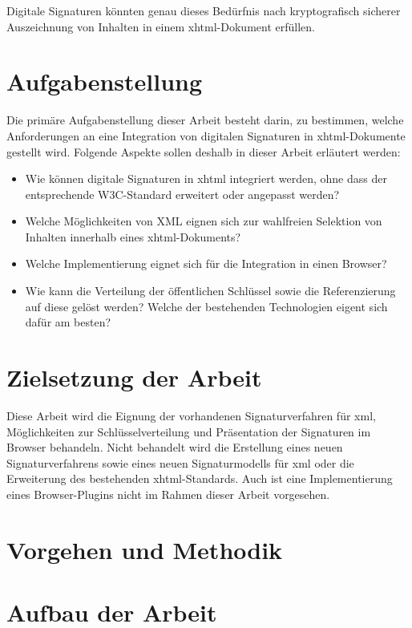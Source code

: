 Digitale Signaturen könnten genau dieses Bedürfnis nach kryptografisch sicherer Auszeichnung von Inhalten in einem \gls{xhtml}-Dokument erfüllen.

\section{Aufgabenstellung}
%
\label{sec:Einleitung:aufgabenstellung}
Die primäre Aufgabenstellung dieser Arbeit besteht darin, zu bestimmen, welche Anforderungen an eine Integration von digitalen Signaturen in
\gls{xhtml}-Dokumente gestellt wird. Folgende Aspekte sollen deshalb in dieser Arbeit erläutert werden:
\begin{itemize}
    \item Wie können digitale Signaturen in \gls{xhtml} integriert werden, ohne dass der entsprechende W3C-Standard\cite{xhtml:w3c} erweitert oder angepasst
    werden?
    \item Welche Möglichkeiten von XML eignen sich zur wahlfreien Selektion von Inhalten innerhalb eines \gls{xhtml}-Dokuments?
    \item Welche Implementierung eignet sich für die Integration in einen Browser?
    \item Wie kann die Verteilung der öffentlichen Schlüssel sowie die Referenzierung auf diese gelöst werden? Welche der bestehenden Technologien eigent sich
    dafür am besten?
\end{itemize}

\section{Zielsetzung der Arbeit}
\label{sec:Einleitung:ziele}
Diese Arbeit wird die Eignung der vorhandenen Signaturverfahren für \gls{xml}, Möglichkeiten zur Schlüsselverteilung und Präsentation der Signaturen im Browser behandeln.
Nicht behandelt wird die Erstellung eines neuen Signaturverfahrens sowie eines neuen Signaturmodells für \gls{xml} oder die Erweiterung des bestehenden \gls{xhtml}-Standards. Auch ist eine Implementierung eines Browser-Plugins nicht im Rahmen dieser Arbeit vorgesehen.

\section{Vorgehen und Methodik}
\label{sec:Einleitung:methodik}
\Blindtext

\section{Aufbau der Arbeit}
\label{sec:Einleitung:aufbau}
\Blindtext

